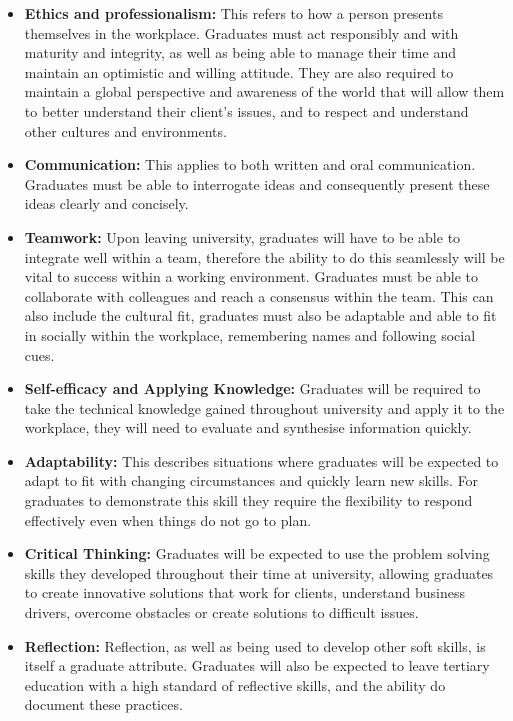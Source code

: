\documentclass{l4proj}
\begin{document}
\begin{itemize}
    \item \textbf{Ethics and professionalism:} This refers to how a person presents themselves in the workplace. Graduates must act responsibly and with maturity and integrity, as well as being able to manage their time and maintain an optimistic and willing attitude. They are also required to maintain a global perspective and awareness of the world that will allow them to better understand their client's issues, and to respect and understand other cultures and environments.
    \item \textbf{Communication:} This applies to both written and oral communication. Graduates must be able to interrogate ideas and consequently present these ideas clearly and concisely.
    \item \textbf{Teamwork:} Upon leaving university, graduates will have to be able to integrate well within a team, therefore the ability to do this seamlessly will be vital to success within a working environment. Graduates must be able to collaborate with colleagues and reach a consensus within the team. This can also include the cultural fit, graduates must also be adaptable and able to fit in socially within the workplace, remembering names and following social cues.
    \item \textbf{Self-efficacy and Applying Knowledge:} Graduates will be required to take the technical knowledge gained throughout university and apply it to the workplace, they will need to evaluate and synthesise information quickly.
    \item \textbf{Adaptability:} This describes situations where graduates will be expected to adapt to fit with changing circumstances and quickly learn new skills. For graduates to demonstrate this skill they require the flexibility to respond effectively even when things do not go to plan. 
    \item \textbf{Critical Thinking:} Graduates will be expected to use the problem solving skills they developed throughout their time at university, allowing graduates to create innovative solutions that work for clients, understand business drivers, overcome obstacles or create solutions to difficult issues.
    \item \textbf{Reflection:} Reflection, as well as being used to develop other soft skills, is itself a graduate attribute. Graduates will also be expected to leave tertiary education with a high standard of reflective skills, and the ability do document these practices. 
\end{itemize}
\end{document}
